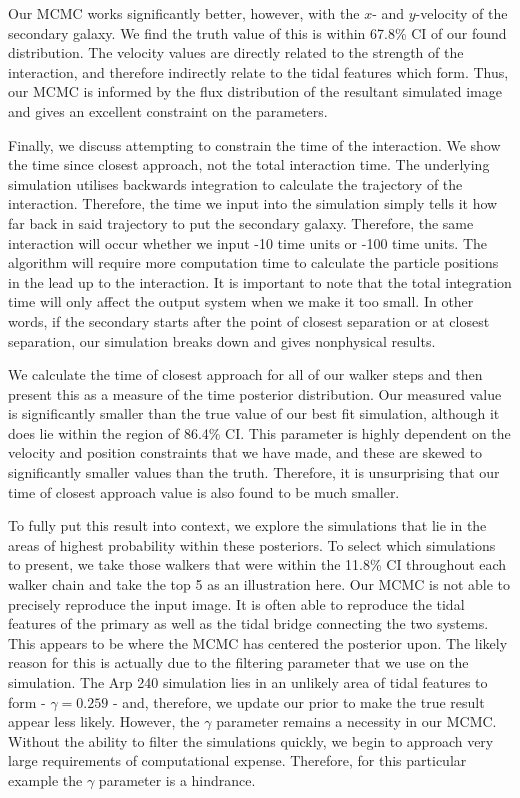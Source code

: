 Our MCMC works significantly better, however, with the $x$- and $y$-velocity of the secondary galaxy. We find the truth value of this is within 67.8\% CI of our found distribution. The velocity values are directly related to the strength of the interaction, and therefore indirectly relate to the tidal features which form. Thus, our MCMC is informed by the flux distribution of the resultant simulated image and gives an excellent constraint on the parameters.

Finally, we discuss attempting to constrain the time of the interaction. We show the time since closest approach, not the total interaction time. The underlying simulation utilises backwards integration to calculate the trajectory of the interaction. Therefore, the time we input into the simulation simply tells it how far back in said trajectory to put the secondary galaxy. Therefore, the same interaction will occur whether we input -10 time units or -100 time units. The algorithm will require more computation time to calculate the particle positions in the lead up to the interaction. It is important to note that the total integration time will only affect the output system when we make it too small. In other words, if the secondary starts after the point of closest separation or at closest separation, our simulation breaks down and gives nonphysical results.

We calculate the time of closest approach for all of our walker steps and then present this as a measure of the time posterior distribution. Our measured value is significantly smaller than the true value of our best fit simulation, although it does lie within the region of 86.4\% CI. This parameter is highly dependent on the velocity and position constraints that we have made, and these are skewed to significantly smaller values than the truth. Therefore, it is unsurprising that our time of closest approach value is also found to be much smaller.

To fully put this result into context, we explore the simulations that lie in the areas of highest probability within these posteriors. To select which simulations to present, we take those walkers that were within the 11.8\% CI throughout each walker chain and take the top 5 as an illustration here. Our MCMC is not able to precisely reproduce the input image. It is often able to reproduce the tidal features of the primary as well as the tidal bridge connecting the two systems. This appears to be where the MCMC has centered the posterior upon. The likely reason for this is actually due to the filtering parameter that we use on the simulation. The Arp 240 simulation lies in an unlikely area of tidal features to form - $\gamma = 0.259$ - and, therefore, we update our prior to make the true result appear less likely. However, the $\gamma$ parameter remains a necessity in our MCMC. Without the ability to filter the simulations quickly, we begin to approach very large requirements of computational expense. Therefore, for this particular example the $\gamma$ parameter is a hindrance.

